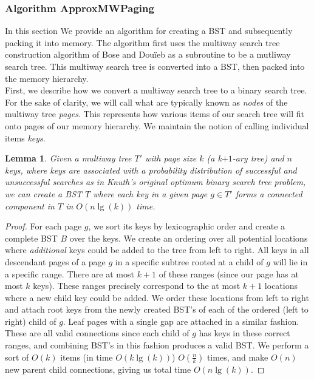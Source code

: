 \documentclass[]{beamer}
\theoremstyle{plain}
\newtheorem{lem}[thm]{Lemma}
\begin{document}
\begin{frame}[fragile] \frametitle{Algorithm ApproxMWPaging}\label{Algorithm ApproxMWPaging}

In this section We provide an algorithm for creating a BST and subsequently packing it into memory. The algorithm first uses the multiway search tree construction algorithm of Bose and Dou\"{i}eb as a subroutine to be a mutliway search tree. This multiway search tree is converted into a BST, then packed into the memory hierarchy. \\

First, we describe how we convert a multiway search tree to a binary search tree. For the sake of clarity, we will call what are typically known as \textit{nodes} of the multiway tree \textit{pages}. This represents how various items of our search tree will fit onto pages of our memory hierarchy. We maintain the notion of calling individual items \textit{keys}.

\begin{lem}\label{MWTBSTLem}
Given a multiway tree $T'$ with page size $k$ (a k$+1$-ary tree) and $n$ keys, where keys are associated with a probability distribution of successful and unsuccessful searches as in Knuth's original optimum binary search tree problem, we can create a BST $T$ where each key in a given page $g \in T'$ forms a connected component in $T$ in $O(n\lg(k))$ time.
\end{lem}

\begin{proof}
For each page $g$, we sort its keys by lexicographic order and create a complete BST $B$ over the keys. We create an ordering over all potential locations where \textit{additional} keys could be added to the tree from left to right. All keys in all descendant pages of a page $g$ in a specific subtree rooted at a child of $g$ will lie in a specific range. There are at most $k+1$ of these ranges (since our page has at most $k$ keys). These ranges precisely correspond to the at most $k+1$ locations where a new child key could be added. We order these locations from left to right and attach root keys from the newly created BST's of each of the ordered (left to right) child of $g$. Leaf pages with a single gap are attached in a similar fashion. These are all valid connections since each child of $g$ has keys in these correct ranges, and combining BST's in this fashion produces a valid BST. We perform a sort of $O(k)$ items (in time $O(k\lg(k))$) $O(\frac{n}{k})$ times, and make $O(n)$ new parent child connections, giving us total time $O(n \lg(k))$.
\end{proof}


\end{frame}
\end{document}

